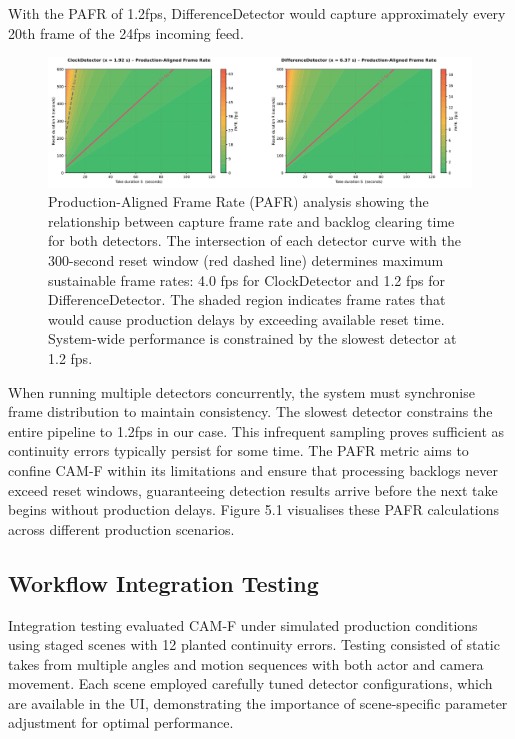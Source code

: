 With the PAFR of 1.2fps, DifferenceDetector would capture approximately every 20th frame of the 24fps incoming feed.

\begin{figure}[h]
\centering
\includegraphics[width=\textwidth]{figures/PAFRplot.png}
\caption{Production-Aligned Frame Rate (PAFR) analysis showing the relationship between capture frame rate and backlog clearing time for both detectors. The intersection of each detector curve with the 300-second reset window (red dashed line) determines maximum sustainable frame rates: 4.0 fps for ClockDetector and 1.2 fps for DifferenceDetector. The shaded region indicates frame rates that would cause production delays by exceeding available reset time. System-wide performance is constrained by the slowest detector at 1.2 fps.}
\label{fig:pafr}
\end{figure}

When running multiple detectors concurrently, the system must synchronise frame distribution to maintain consistency. The slowest detector constrains the entire pipeline to 1.2fps in our case. This infrequent sampling proves sufficient as continuity errors typically persist for some time. The PAFR metric aims to confine CAM-F within its limitations and ensure that processing backlogs never exceed reset windows, guaranteeing detection results arrive before the next take begins without production delays. Figure 5.1 visualises these PAFR calculations across different production scenarios.

\subsection{Workflow Integration Testing}
Integration testing evaluated CAM-F under simulated production conditions using staged scenes with 12 planted continuity errors. Testing consisted of static takes from multiple angles and motion sequences with both actor and camera movement. Each scene employed carefully tuned detector configurations, which are available in the UI, demonstrating the importance of scene-specific parameter adjustment for optimal performance.

